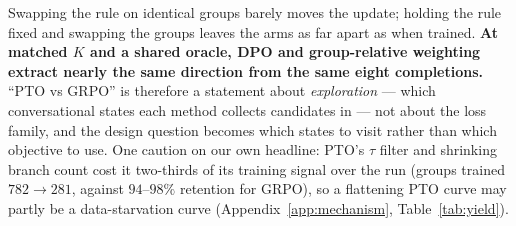 \noindent
Swapping the rule on identical groups barely moves the update; holding the rule fixed and
swapping the groups leaves the arms as far apart as when trained. \textbf{At matched $K$ and
a shared oracle, DPO and group-relative weighting extract nearly the same direction from the
same eight completions.} ``PTO vs GRPO'' is therefore a statement about \emph{exploration}
--- which conversational states each method collects candidates in --- not about the loss
family, and the design question becomes which states to visit rather than which objective to
use. One caution on our own headline: PTO's $\tau$ filter and shrinking branch count cost it
two-thirds of its training signal over the run (groups trained $782 \to 281$, against
$94$--$98\%$ retention for GRPO), so a flattening PTO curve may partly be a data-starvation
curve (Appendix~\ref{app:mechanism}, Table~\ref{tab:yield}).
